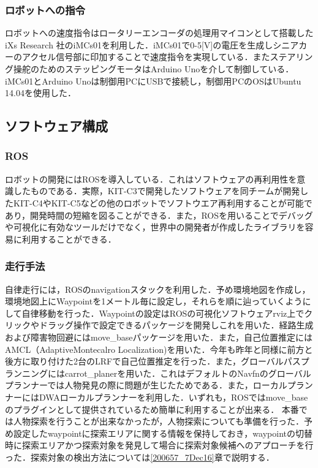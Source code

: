 \documentclass[10pt,a4paper]{jarticle}
\begin{document}
\subsubsection{ロボットへの指令}
ロボットへの速度指令はロータリーエンコーダの処理用マイコンとして搭載した iXs Research 社のiMCs01を利用した．iMCs01で0-5[V]の電圧を生成しシニアカーのアクセル信号部に印加することで速度指令を実現している．またステアリング操舵のためのステッピングモータはArduino Unoを介して制御している．iMCs01とArduino Unoは制御用PCにUSBで接続し，制御用PCのOSはUbuntu 14.04を使用した．

\subsection{ソフトウェア構成}
\subsubsection{ROS}
ロボットの開発にはROS\cite{ros}を導入している．これはソフトウェアの再利用性を意識したものである．実際，KIT-C3で開発したソフトウェアを同チームが開発したKIT-C4やKIT-C5などの他のロボットでソフトウエア再利用することが可能であり，開発時間の短縮を図ることができる．また，ROSを用いることでデバッグや可視化に有効なツールだけでなく，世界中の開発者が作成したライブラリを容易に利用することができる．

\subsubsection{走行手法}
自律走行には，ROSのnavigationスタックを利用した．予め環境地図を作成し，環境地図上にWaypointを1メートル毎に設定し，それらを順に辿っていくようにして自律移動を行った．Waypointの設定はROSの可視化ソフトウェアrviz上でクリックやドラッグ操作で設定できるパッケージを開発しこれを用いた．経路生成および障害物回避にはmove\_baseパッケージを用いた．また，自己位置推定にはAMCL（AdaptiveMontecalro Localization)を用いた．今年も昨年と同様に前方と後方に取り付けた2台のLRFで自己位置推定を行った．また，グローバルパスプランニングにはcarrot\_planerを用いた．これはデフォルトのNavfnのグローバルプランナーでは人物発見の際に問題が生じたためである．また，ローカルプランナーにはDWAローカルプランナーを利用した．いずれも，ROSではmove\_baseのプラグインとして提供されているため簡単に利用することが出来る．
本番では人物探索を行うことが出来なかったが，人物探索についても準備を行った．予め設定したwaypointに探索エリアに関する情報を保持しておき，waypointの切替時に探索エリアかつ探索対象を発見して場合に探索対象候補へのアプローチを行った．探索対象の検出方法については\ref{200657_7Dec16}章で説明する．
\end{document}
